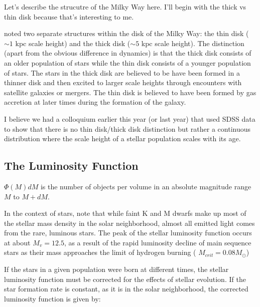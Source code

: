 Let's describe the strucutre of the Milky Way here.  I'll begin with the thick vs thin disk
because that's interesting to me.

 noted two separate structures within the disk of the
Milky Way: the thin disk ($\sim1$ kpc scale height) and the thick disk
($\sim5$ kpc scale height).  The distinction (apart from the obvious difference in dynamics)
is that the thick disk consists of an older population of stars while the thin disk consists
of a younger population of stars.
The stars in the thick disk are believed to be have been formed in a thinner disk and then
excited to larger scale heights through encounters with satellite galaxies or mergers.
The thin disk is believed to have been formed by gas
accretion at later times during the formation of the galaxy.

I believe we had a colloquium earlier this year (or last year) that used SDSS data to show
that there is no thin disk/thick disk distinction but rather a continuous distribution
where the scale height of a stellar population scales with its age.

\subsection{The Luminosity Function}

 $\Phi(M)dM$
is the number of objects per volume in an absolute magnitude range $M$ to $M+dM$. 

In the context of stars, note that while faint K and M dwarfs make up most of
the stellar mass density in the solar neighborhood, almost all emitted light
comes from the rare, luminous stars.
The peak of the stellar luminosity function occurs at about $M_v = 12.5$, as a result of the rapid luminosity decline of main sequence stars as their mass approaches the limit of hydrogen burning ( $M_{crit} = 0.08 M_\odot$)

If the stars in a given population were born at different times, the stellar luminosity function must be corrected for the effects of stellar evolution. If the star formation rate is constant, as it is in the solar neighborhood,  the corrected luminosity function is given by:


